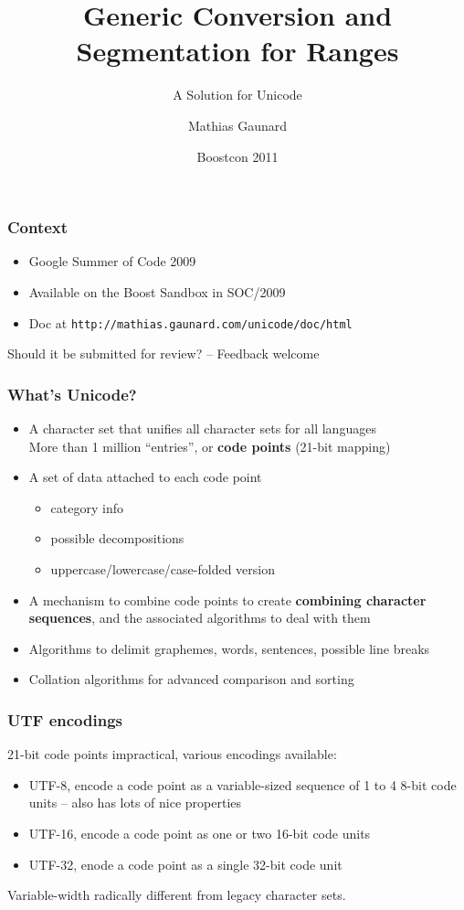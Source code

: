 \documentclass{beamer}
\title%
{Generic Conversion and Segmentation for Ranges}
\subtitle
{A Solution for Unicode}
\author%
{Mathias Gaunard}
\institute[MetaScale] %
{MetaScale Inc.}
\date%
{Boostcon 2011}
\begin{document}
\begin{frame}
\titlepage
\end{frame}

\begin{frame}
	\frametitle{Context}
	
	\begin{itemize}
		\item Google Summer of Code 2009
		\item Available on the Boost Sandbox in SOC/2009
		\item Doc at \lstinline{http://mathias.gaunard.com/unicode/doc/html}
	\end{itemize}
	\bigskip
	
	Should it be submitted for review? -- Feedback welcome
\end{frame}

\begin{frame}
	\frametitle{What's Unicode?}

	\begin{itemize}
		\item A character set that unifies all character sets for all languages\\
		      More than 1 million ``entries'', or \textbf{code points} (21-bit mapping)
		\item A set of data attached to each code point
		      \begin{itemize}
		      	\item category info
		      	\item possible decompositions
		      	\item uppercase/lowercase/case-folded version
		      \end{itemize}
		\item A mechanism to combine code points to create \textbf{combining character sequences},
		      and the associated algorithms to deal with them
		\item Algorithms to delimit graphemes, words, sentences, possible line breaks
		\item Collation algorithms for advanced comparison and sorting 
	\end{itemize}

\end{frame}

\begin{frame}
	\frametitle{UTF encodings}
	
	21-bit code points impractical, various encodings available:
	
	\begin{itemize}
		\item UTF-8, encode a code point as a variable-sized sequence of 1 to 4 8-bit code units -- also has lots of nice properties
		\item UTF-16, encode a code point as one or two 16-bit code units
		\item UTF-32, enode a code point as a single 32-bit code unit
	\end{itemize}
	\bigskip
	
	Variable-width radically different from legacy character sets.
	
\end{frame}
\end{document}
